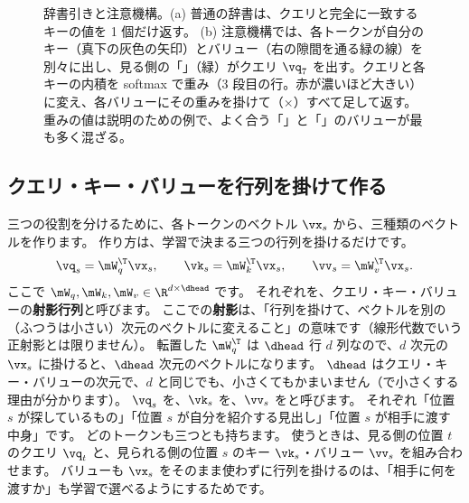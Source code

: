 \begin{figure}[tbp]
\caption{辞書引きと注意機構。(a) 普通の辞書は、クエリと完全に一致するキーの値を 1 個だけ返す。
(b) 注意機構では、各トークンが自分のキー（真下の灰色の矢印）とバリュー（右の隙間を通る緑の線）を別々に出し、見る側の「\code{=}」（緑）がクエリ $\vq_7$ を出す。クエリと各キーの内積を softmax で重み（3 段目の行。赤が濃いほど大きい）に変え、各バリューにその重みを掛けて（$\times$）すべて足して返す。
重みの値は説明のための例で、よく合う「」と「」のバリューが最も多く混ざる。}
\label{fig:attn-lookup}
\end{figure}

\subsection*{クエリ・キー・バリューを行列を掛けて作る}

三つの役割を分けるために、各トークンのベクトル $\vx_s$ から、三種類のベクトルを作ります。
作り方は、学習で決まる三つの行列を掛けるだけです。
\begin{equation}
\vq_s = \mW_q^\T\vx_s,\qquad \vk_s = \mW_k^\T\vx_s,\qquad \vv_s = \mW_v^\T\vx_s .
\label{eq:attn-qkv-vec}
\end{equation}
ここで $\mW_q, \mW_k, \mW_v \in \R^{d\times\dhead}$ です。
それぞれを、クエリ・キー・バリューの\textbf{射影行列}と呼びます。
ここでの\textbf{射影}は、「行列を掛けて、ベクトルを別の（ふつうは小さい）次元のベクトルに変えること」の意味です（線形代数でいう正射影とは限りません）。
転置した $\mW_q^\T$ は $\dhead$ 行 $d$ 列なので、$d$ 次元の $\vx_s$ に掛けると、$\dhead$ 次元のベクトルになります。
$\dhead$ はクエリ・キー・バリューの次元で、$d$ と同じでも、小さくてもかまいません（で小さくする理由が分かります）。
$\vq_s$ を、$\vk_s$ を、$\vv_s$ をと呼びます。
それぞれ「位置 $s$ が探しているもの」「位置 $s$ が自分を紹介する見出し」「位置 $s$ が相手に渡す中身」です。
どのトークンも三つとも持ちます。
使うときは、見る側の位置 $t$ のクエリ $\vq_t$ と、見られる側の位置 $s$ のキー $\vk_s$・バリュー $\vv_s$ を組み合わせます。
バリューも $\vx_s$ をそのまま使わずに行列を掛けるのは、「相手に何を渡すか」も学習で選べるようにするためです。

